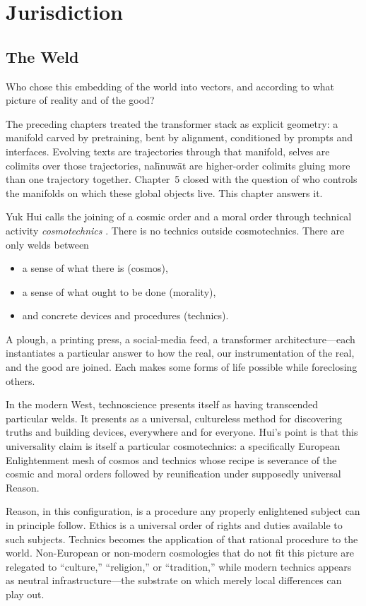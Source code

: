 \chapter{Jurisdiction}

\section{The Weld}

Who chose this embedding of the world into vectors, and according to what picture of reality and of the good?

The preceding chapters treated the transformer stack as explicit geometry: a manifold carved by pretraining, bent by alignment, conditioned by prompts and interfaces. Evolving texts are trajectories through that manifold, selves are colimits over those trajectories, na\={h}nuw\={a}t are higher-order colimits gluing more than one trajectory together. Chapter~5 closed with the question of who controls the manifolds on which these global objects live. This chapter answers it.

Yuk Hui calls the joining of a cosmic order and a moral order through technical activity \emph{cosmotechnics} \cite{Hui2016}. There is no technics outside cosmotechnics. There are only welds between

\begin{itemize}
  \item a sense of what there is (cosmos),
  \item a sense of what ought to be done (morality),
  \item and concrete devices and procedures (technics).
\end{itemize}

A plough, a printing press, a social-media feed, a transformer architecture---each instantiates a particular answer to how the real, our instrumentation of the real, and the good are joined. Each makes some forms of life possible while foreclosing others.

In the modern West, technoscience presents itself as having transcended particular welds. It presents as a universal, cultureless method for discovering truths and building devices, everywhere and for everyone. Hui's point is that this universality claim is itself a particular cosmotechnics: a specifically European Enlightenment mesh of cosmos and technics whose recipe is severance of the cosmic and moral orders followed by reunification under supposedly universal Reason.

Reason, in this configuration, is a procedure any properly enlightened subject can in principle follow. Ethics is a universal order of rights and duties available to such subjects. Technics becomes the application of that rational procedure to the world. Non-European or non-modern cosmologies that do not fit this picture are relegated to ``culture,'' ``religion,'' or ``tradition,'' while modern technics appears as neutral infrastructure---the substrate on which merely local differences can play out.

